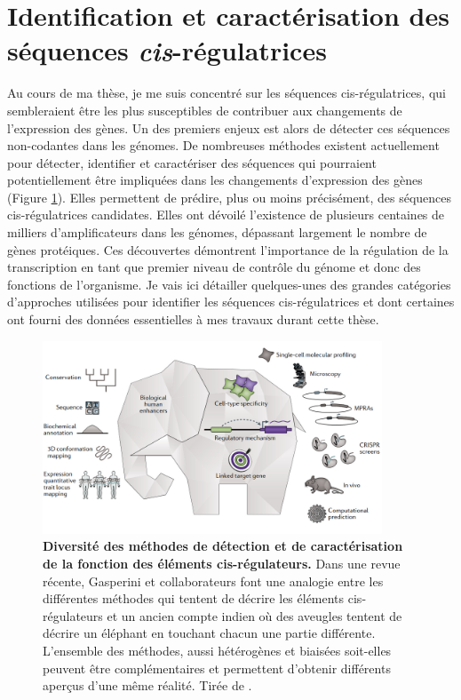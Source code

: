 \section{Identification et caractérisation des séquences \textit{cis}-régulatrices}
\label{sec:identif-cis}

Au cours de ma thèse, je me suis concentré sur les séquences \gls{cis}-régulatrices, qui sembleraient être les plus susceptibles de contribuer aux changements de l’expression des gènes. Un des premiers enjeux est alors de détecter ces séquences non-codantes dans les génomes. De nombreuses méthodes existent actuellement pour détecter, identifier et caractériser des séquences qui pourraient potentiellement être impliquées dans les changements d’expression des gènes (Figure \ref{fig:Fig7}). Elles permettent de prédire, plus ou moins précisément, des séquences \gls{cis}-régulatrices candidates. Elles ont dévoilé l’existence de plusieurs centaines de milliers d’\glspl{amplificateur} dans les génomes, dépassant largement le nombre de gènes protéiques. Ces découvertes démontrent l’importance de la régulation de la transcription en tant que premier niveau de contrôle du génome et donc des fonctions de l’organisme. Je vais ici détailler quelques-unes des grandes catégories d’approches utilisées pour identifier les séquences \gls{cis}-régulatrices et dont certaines ont fourni des données essentielles à mes travaux durant cette thèse. \\

\begin{figure}[h]
 \centering
 \includegraphics[width=0.9\textwidth, page=1] {figures/introduction/fig7.png}
 \caption[Diversité des méthodes de détection et de caractérisation de la fonction des éléments \gls{cis}-régulateurs.]{
 \textbf{Diversité des méthodes de détection et de caractérisation de la fonction des éléments \gls{cis}-régulateurs.}
 Dans une revue récente, Gasperini et collaborateurs font une analogie entre les différentes méthodes qui tentent de décrire les éléments \gls{cis}-régulateurs et un ancien compte indien où des aveugles tentent de décrire un éléphant en touchant chacun une partie différente. L'ensemble des méthodes, aussi hétérogènes et biaisées soit-elles peuvent être complémentaires et permettent d'obtenir différents aperçus d'une même réalité. Tirée de \citet{gasperini_towards_2020}.
 }
 \label{fig:Fig7}
\end{figure}


